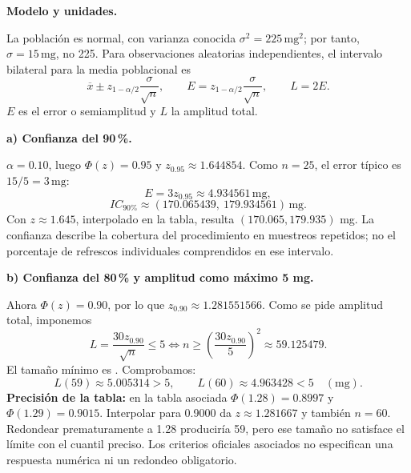 \textbf{Modelo y unidades.}\par\nopagebreak[4]
La población es normal, con varianza conocida $\sigma^2=225\,\mathrm{mg}^2$; por tanto, $\sigma=15\,\mathrm{mg}$, no 225. Para observaciones aleatorias independientes, el intervalo bilateral para la media poblacional es
\[
\overline x\pm z_{1-\alpha/2}\frac{\sigma}{\sqrt n},
\qquad E=z_{1-\alpha/2}\frac{\sigma}{\sqrt n},\qquad L=2E.
\]
$E$ es el error o semiamplitud y $L$ la amplitud total.

\textbf{a) Confianza del 90\,\%.}\par\nopagebreak[4]
$\alpha=0.10$, luego $\Phi(z)=0.95$ y $z_{0.95}\approx1.644854$. Como $n=25$, el error típico es $15/5=3\,\mathrm{mg}$:
\[
E=3z_{0.95}\approx4.934561\,\mathrm{mg},
\]
\[
\boxed{IC_{\text{90\%}}\approx(170.065439,\ 179.934561)\,\mathrm{mg}.}
\]
Con $z\approx1.645$, interpolado en la tabla, resulta $(170.065,179.935)$ mg. La confianza describe la cobertura del procedimiento en muestreos repetidos; no el porcentaje de refrescos individuales comprendidos en ese intervalo.

\textbf{b) Confianza del 80\,\% y amplitud como máximo 5 mg.}\par\nopagebreak[4]
Ahora $\Phi(z)=0.90$, por lo que $z_{0.90}\approx1.281551566$. Como se pide amplitud total, imponemos
\[
L=\frac{30z_{0.90}}{\sqrt n}\leq5
\iff n\geq\left(\frac{30z_{0.90}}5\right)^2
\approx59.125479.
\]
El tamaño mínimo es . Comprobamos:
\[
L(59)\approx5.005314>5,\qquad L(60)\approx4.963428<5\quad(\mathrm{mg}).
\]
\textbf{Precisión de la tabla:} en la tabla asociada $\Phi(1.28)=0.8997$ y $\Phi(1.29)=0.9015$. Interpolar para 0.9000 da $z\approx1.281667$ y también $n=60$. Redondear prematuramente a 1.28 produciría 59, pero ese tamaño no satisface el límite con el cuantil preciso. Los criterios oficiales asociados no especifican una respuesta numérica ni un redondeo obligatorio.
